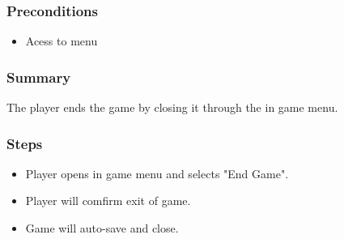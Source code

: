 \documentclass[12pt]{report}
\begin{document}
        \subsubsection{Preconditions}
        \begin{itemize}
            \item Acess to menu
        \end{itemize}

        \subsubsection{Summary}
        The player ends the game by closing it through the in game menu.

        \subsubsection{Steps}
        \begin{itemize}
            \item Player opens in game menu and selects "End Game".
            \item Player will comfirm exit of game.
            \item Game will auto-save and close.
        \end{itemize}
\end{document}
